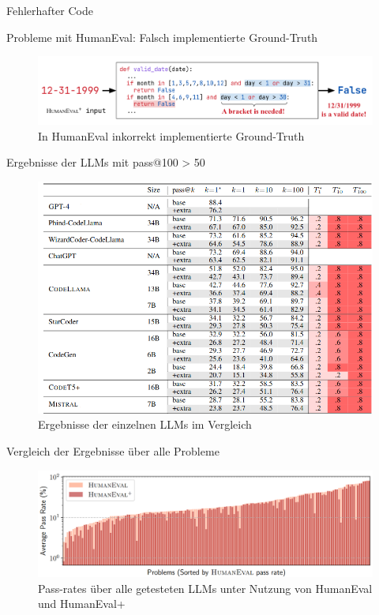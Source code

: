 \documentclass{beamer}              %
\begin{document}
\begin{frame}{Fehlerhafter Code}
\begin{frame}{Probleme mit HumanEval: Falsch implementierte Ground-Truth}
    \begin{figure}
        \centering
        \includegraphics[width=0.8\paperwidth]{images/groundtruthwrong.png}
        \caption{In HumanEval inkorrekt implementierte Ground-Truth\cite{liu2024your}}
    \end{figure}
\end{frame}

\begin{frame}{Ergebnisse der LLMs mit pass@100 > 50}
    \begin{figure}
        \centering
        \includegraphics[width=0.7\paperwidth]{images/resultshumaneval+.png}
        \caption{Ergebnisse der einzelnen LLMs im Vergleich\cite{liu2024your}}
    \end{figure}
\end{frame}

\begin{frame}{Vergleich der Ergebnisse über alle Probleme}
    \begin{figure}
        \centering
        \includegraphics[width=0.8\paperwidth]{images/evalandevalpluscompare.png}
        \caption{Pass-rates über alle getesteten LLMs unter Nutzung von HumanEval und HumanEval+\cite{liu2024your}}
    \end{figure}
\end{frame}


\end{frame}
\end{document}
